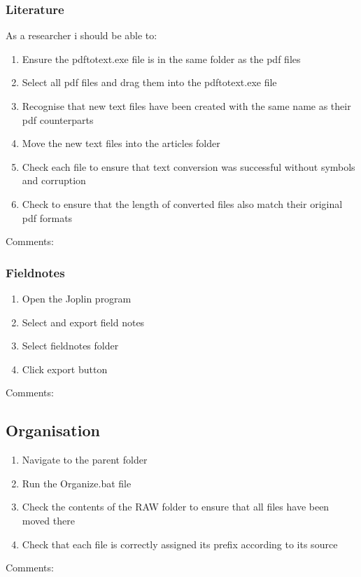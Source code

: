 \documentclass[11pt, a4paper,]{scrartcl}
\begin{document}
\subsubsection{Literature}
As a researcher i should be able to:
\begin{enumerate}
    \item Ensure the pdftotext.exe file is in the same folder as the pdf files
    \item Select all pdf files and drag them into the pdftotext.exe file
    \item Recognise that new text files have been created with the same name as their pdf counterparts
    \item Move the new text files into the articles folder
    \item Check each file to ensure that text conversion was successful without symbols and corruption
    \item Check to ensure that the length of converted files also match their original pdf formats
\end{enumerate}
Comments:
\vspace{2cm}
\subsubsection{Fieldnotes}
\begin{enumerate}
    \item Open the Joplin program
    \item Select and export field notes
    \item Select fieldnotes folder
    \item Click export button
\end{enumerate}
Comments:
\vspace{2cm}

\subsection{Organisation}
\begin{enumerate}
    \item Navigate to the parent folder
    \item Run the Organize.bat file
    \item Check the contents of the RAW folder to ensure that all files have been moved there
    \item Check that each file is correctly assigned its prefix according to its source
\end{enumerate}
Comments:
\vspace{2cm}
\end{document}
